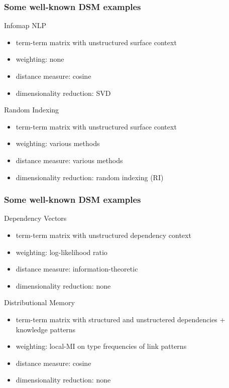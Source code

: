 \begin{frame}
  \frametitle{Some well-known DSM examples}

  \ungap
  \begin{block} {Infomap NLP \citep{Widdows:04}}
  \begin{itemize}
  \item term-term matrix with unstructured surface context
  \item weighting: none
  \item distance measure: cosine
  \item dimensionality reduction: SVD
  \end{itemize}
  \end{block}
 
  \begin{block} {Random Indexing \citep{Karlgren:Sahlgren:01}}
    \begin{itemize}
    \item term-term matrix with unstructured surface context
    \item weighting: various methods 
    \item distance measure: various methods
    \item dimensionality reduction: random indexing (RI)
    \end{itemize}
  \end{block}
\end{frame}

\begin{frame}
  \frametitle{Some well-known DSM examples}

  \ungap
  \begin{block}{Dependency Vectors \citep{Pado:Lapata:07}}
  \begin{itemize}
  \item term-term matrix with unstructured dependency context
  \item weighting: log-likelihood ratio
  \item distance measure: information-theoretic \citep{Lin:98a}
  \item dimensionality reduction: none
  \end{itemize}
  \end{block}
 
 \begin{block} {Distributional Memory \citep{Baroni:Lenci:10}}
  \begin{itemize}
  \item term-term matrix with structured and unstructered dependencies + knowledge patterns
  \item weighting: local-MI on type frequencies of link patterns
  \item distance measure: cosine
  \item dimensionality reduction: none
  \end{itemize}
  \end{block}
 \end{frame}

